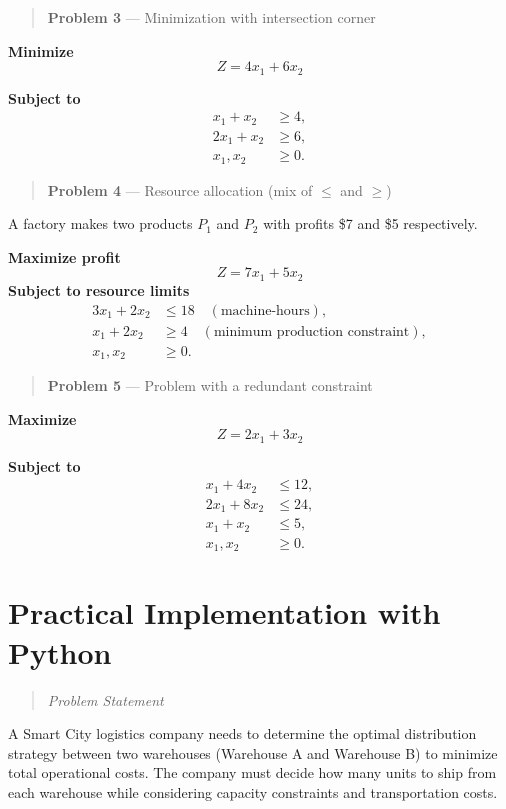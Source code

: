 \documentclass[
  letterpaper,
  DIV=11,
  numbers=noendperiod]{scrreprt}
\begin{document}
\begin{quote}
\textbf{Problem 3} --- Minimization with intersection corner
\end{quote}

\textbf{Minimize} \[
Z = 4x_1 + 6x_2
\]

\textbf{Subject to} \[
\begin{aligned}
x_1 + x_2 &\ge 4,\\
2x_1 + x_2 &\ge 6,\\
x_1, x_2 &\ge 0.
\end{aligned}
\]

\begin{quote}
\textbf{Problem 4} --- Resource allocation (mix of \(\le\) and \(\ge\))
\end{quote}

A factory makes two products \(P_1\) and \(P_2\) with profits \$7 and
\$5 respectively.

\textbf{Maximize profit} \[
Z = 7x_1 + 5x_2
\] \textbf{Subject to resource limits} \[
\begin{aligned}
3x_1 + 2x_2 &\le 18 \quad (\text{machine-hours}),\\
x_1 + 2x_2 &\ge 4 \quad (\text{minimum production constraint}),\\
x_1, x_2 &\ge 0.
\end{aligned}
\]

\begin{quote}
\textbf{Problem 5} --- Problem with a redundant constraint
\end{quote}

\textbf{Maximize} \[
Z = 2x_1 + 3x_2
\]

\textbf{Subject to} \[
\begin{aligned}
x_1 + 4x_2 &\le 12,\\
2x_1 + 8x_2 &\le 24,\\
x_1 + x_2 &\le 5,\\
x_1, x_2 &\ge 0.
\end{aligned}
\]

\section{Practical Implementation with
Python}\label{practical-implementation-with-python}

\begin{quote}
\emph{Problem Statement}
\end{quote}

A Smart City logistics company needs to determine the optimal
distribution strategy between two warehouses (Warehouse A and Warehouse
B) to minimize total operational costs. The company must decide how many
units to ship from each warehouse while considering capacity constraints
and transportation costs.
\end{document}
